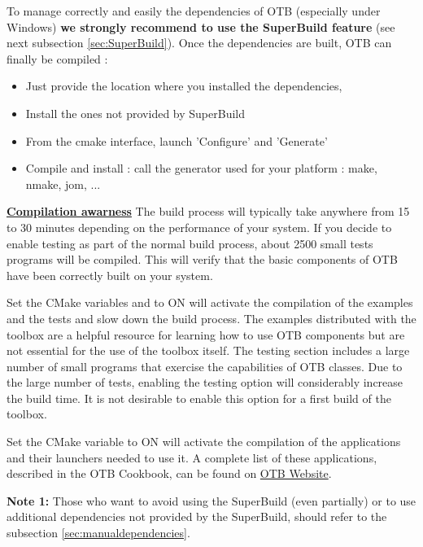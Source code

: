 To manage correctly and easily the dependencies of OTB (especially under Windows) \textbf{we strongly recommend to use the SuperBuild feature} (see next subsection \ref{sec:SuperBuild}).
Once the dependencies are built, OTB can finally be compiled : 
\begin{itemize}
	\item Just provide the location where you installed the dependencies, 
	\item Install the ones not provided by SuperBuild
    \item From the cmake interface, launch 'Configure' and 'Generate'
    \item Compile and install : call the generator used for your platform : make, nmake, jom, ... 
\end{itemize}

\textbf{\underline{Compilation awarness}}
The build process will typically take anywhere from 15 to 30 minutes depending on the performance of your system. If you decide to enable testing as part of the normal build process, about 2500 small tests programs will be compiled. This will verify that the basic components of OTB have been correctly built on your system.

Set the CMake variables  and  to ON will activate the compilation of the examples and the tests and slow down the build process. The examples distributed with the toolbox are a helpful resource for learning how to use OTB components but are not essential for the use of the toolbox itself. The testing section includes a large number of small programs that exercise the capabilities of OTB classes. Due to the large number of tests, enabling the testing option will considerably increase the build time.  It is not desirable to enable this option for a first build of the toolbox.

Set the CMake variable  to ON will activate the compilation of the applications and their launchers needed to use it. A complete list of these applications, described in the OTB Cookbook, can be found on \href{http://orfeo-toolbox.org/Applications/index.html}{OTB Website}.




\textbf{Note 1:} Those who want to avoid using the SuperBuild (even partially) or to use additional dependencies not provided by the SuperBuild, should refer to the subsection \ref{sec:manualdependencies}. 



